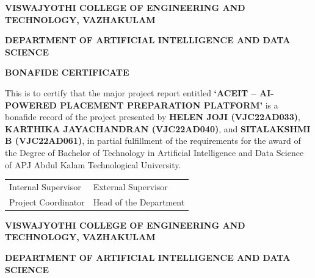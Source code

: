 \documentclass[12pt,a4paper]{report}
\newcommand{\logobox}{%
    \fbox{\parbox{0.22\textwidth}{%
        \centering\vspace{1.0cm}\small [COLLEGE LOGO]\vspace{1.0cm}%
    }}%
}
\begin{document}
\clearpage
\pagestyle{empty}
\begin{center}
    {\large\bfseries VISWAJYOTHI COLLEGE OF ENGINEERING AND TECHNOLOGY, VAZHAKULAM}
    \par\vspace{0.2cm}
    {\large\bfseries DEPARTMENT OF ARTIFICIAL INTELLIGENCE AND DATA SCIENCE}
    \par\vspace{0.8cm}
    \logobox
    \par\vspace{0.6cm}
    {\large\bfseries BONAFIDE CERTIFICATE}
    \par\vspace{0.8cm}
\end{center}

\noindent
This is to certify that the major project report entitled
\textbf{`ACEIT -- AI-POWERED PLACEMENT PREPARATION PLATFORM'}
is a bonafide record of the project presented by
\textbf{HELEN JOJI (VJC22AD033)},
\textbf{KARTHIKA JAYACHANDRAN (VJC22AD040)},
and \textbf{SITALAKSHMI B (VJC22AD061)},
in partial fulfillment of the requirements for the award of the
Degree of Bachelor of Technology in Artificial Intelligence and Data Science
of APJ Abdul Kalam Technological University.

\vspace{3.0cm}

\noindent
\begin{tabular}{p{} p{}}
    Internal Supervisor & External Supervisor \\[2.5cm]
    Project Coordinator & Head of the Department \\
\end{tabular}
\clearpage

\clearpage
\pagestyle{empty}
\begin{center}
    {\large\bfseries VISWAJYOTHI COLLEGE OF ENGINEERING AND TECHNOLOGY, VAZHAKULAM}
    \par\vspace{0.2cm}
    {\large\bfseries DEPARTMENT OF ARTIFICIAL INTELLIGENCE AND DATA SCIENCE}
    \par\vspace{0.6cm}
\end{center}
\end{document}
